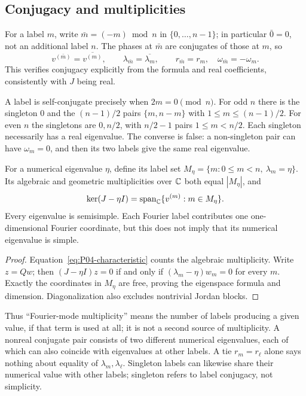 \subsection{Conjugacy and multiplicities}

For a label $m$, write $\bar m=(-m)\bmod n$ in $\{0,\ldots,n-1\}$;
in particular $\bar0=0$, not an additional label $n$.
The phases at $\bar m$ are conjugates of those at $m$, so
\begin{equation}
 v^{(\bar m)}=\overline{v^{(m)}},\qquad
 \lambda_{\bar m}=\overline{\lambda_m},\qquad
 r_{\bar m}=r_m,\quad \omega_{\bar m}=-\omega_m.
 \label{eq:P04-conjugacy}
\end{equation}
This verifies conjugacy explicitly from the formula and real
coefficients, consistently with $J$ being real.

A label is self-conjugate precisely when $2m=0\pmod n$.
For odd $n$ there is the singleton $0$ and the $(n-1)/2$ pairs
$\{m,n-m\}$ with $1\le m\le(n-1)/2$.
For even $n$ the singletons are $0,n/2$, with $n/2-1$ pairs
$1\le m<n/2$. Each singleton necessarily has a real eigenvalue.
The converse is false: a non-singleton pair can have $\omega_m=0$,
and then its two labels give the same real eigenvalue.

\begin{proposition}
\label{prop:P04-multiplicity}
For a numerical eigenvalue $\eta$, define its label set
$M_\eta=\{m:0\le m<n,\ \lambda_m=\eta\}$.
Its algebraic and geometric multiplicities over $\mathbb{C}$ both equal
$|M_\eta|$, and
\[
 \ker(J-\eta I)=\operatorname{span}_{\mathbb{C}}
                  \{v^{(m)}:m\in M_\eta\}.
\]
Every eigenvalue is semisimple. Each Fourier label contributes one
one-dimensional Fourier coordinate, but this does not imply that
its numerical eigenvalue is simple.
\end{proposition}
\begin{proof}
Equation~\eqref{eq:P04-characteristic} counts the algebraic
multiplicity. Write $z=Qw$; then $(J-\eta I)z=0$ if and only if
$(\lambda_m-\eta)w_m=0$ for every $m$. Exactly the coordinates in
$M_\eta$ are free, proving the eigenspace formula and dimension.
Diagonalization also excludes nontrivial Jordan blocks.
\end{proof}

Thus ``Fourier-mode multiplicity'' means the number of labels
producing a given value, if that term is used at all; it is not a
second source of multiplicity. A nonreal conjugate pair consists
of two different numerical eigenvalues, each of which can also
coincide with eigenvalues at other labels. A tie $r_m=r_\ell$
alone says nothing about equality of $\lambda_m,\lambda_\ell$.
Singleton labels can likewise share their numerical value with
other labels; singleton refers to label conjugacy, not simplicity.


